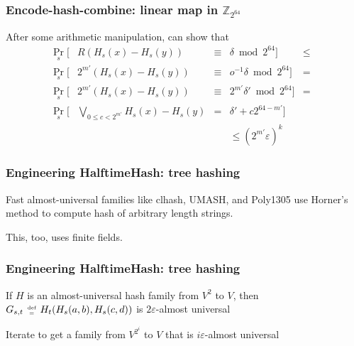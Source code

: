\documentclass[xcolor=dvipsnames]{beamer}
\newcommand{\defeq}{\;\genfrac{}{}{0pt}{2}{\text{def}}{=}\;}
\begin{document}
\begin{frame}
  \frametitle{Encode-hash-combine: linear map \textbf{in $\mathbb{Z}_{2^{64}}$}}

  After some arithmetic manipulation, can show that
  \[
  \begin{array}{lrcrcl}
    \Pr_s[&R(H_s(x) - H_s(y)) & \equiv & \delta \bmod 2^{64}] & \le & \\
    \Pr_s[&2^{m'}(H_s(x) - H_s(y)) & \equiv & o^{-1} \delta \bmod 2^{64}] & = & \\
    \Pr_s[&2^{m'}(H_s(x) - H_s(y)) & \equiv & 2^{m'} \delta' \bmod 2^{64}] & = & \\
    \Pr_s[&\bigvee_{0 \le c < 2^{m'}} H_s(x) - H_s(y) & = &  \delta'  + c 2^{64 -m'}] &  & \\
    & & &\le  (2^{m'} \varepsilon)^{k}
  \end{array}
  \]
\end{frame}

\begin{frame}
  \frametitle{Engineering HalftimeHash: tree hashing}
  Fast almost-universal families like clhash, UMASH, and Poly1305 use Horner's method to compute hash of arbitrary length strings.
  \pause

  $ $\\
  This, too, uses finite fields.
\end{frame}

\begin{frame}
  \frametitle{Engineering HalftimeHash: tree hashing}
  If $H$ is an almost-universal hash family from $V^2$ to $V$, then
  $G_{s,t} \defeq H_t(H_s(a, b), H_s(c,d))$ is $2 \varepsilon$-almost universal
  \pause
  
  $ $\\
  Iterate to get a family from  $V^{2^i}$ to $V$ that is $i \varepsilon$-almost universal
\end{frame}

\end{document}
